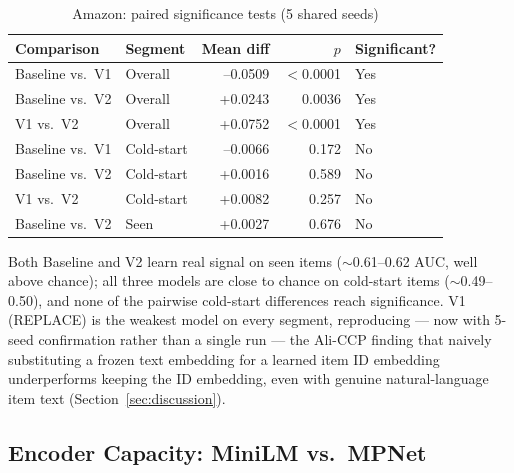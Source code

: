 \begin{table}[h]
\centering
\caption{Amazon: paired significance tests (5 shared seeds)}
\label{tab:amazon-sig}
\begin{tabular}{llrrl}
\toprule
Comparison & Segment & Mean diff & $p$ & Significant? \\
\midrule
Baseline vs.\ V1 & Overall\footnotemark\label{fn:amazon-sig-overall} & --0.0509 & $<$0.0001 & Yes \\
Baseline vs.\ V2 & Overall\footnotemark[\ref{fn:amazon-sig-overall}] & +0.0243 & 0.0036 & Yes \\
V1 vs.\ V2       & Overall\footnotemark[\ref{fn:amazon-sig-overall}] & +0.0752 & $<$0.0001 & Yes \\
Baseline vs.\ V1 & Cold-start & --0.0066 & 0.172 & No \\
Baseline vs.\ V2 & Cold-start & +0.0016 & 0.589 & No \\
V1 vs.\ V2       & Cold-start & +0.0082 & 0.257 & No \\
Baseline vs.\ V2 & Seen & +0.0027 & 0.676 & No \\
\bottomrule
\end{tabular}
\end{table}

Both Baseline and V2 learn real signal on seen items ($\sim$0.61--0.62 AUC, well above chance); all three models are close to chance on cold-start items ($\sim$0.49--0.50), and none of the pairwise cold-start differences reach significance. V1 (REPLACE) is the weakest model on every segment, reproducing --- now with 5-seed confirmation rather than a single run --- the Ali-CCP finding that naively substituting a frozen text embedding for a learned item ID embedding underperforms keeping the ID embedding, even with genuine natural-language item text (Section~\ref{sec:discussion}).

\subsection{Encoder Capacity: MiniLM vs.\ MPNet}
\label{sec:results-amazon-encoders}

